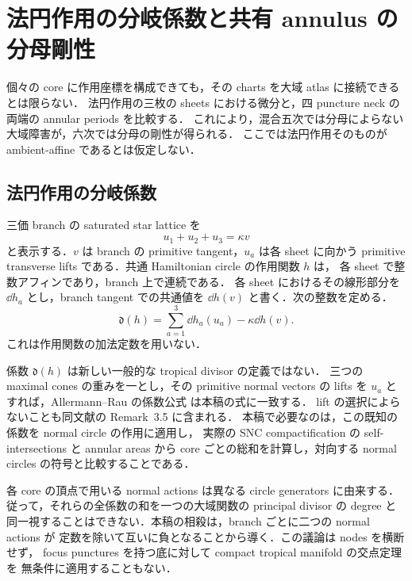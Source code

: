 \section{法円作用の分岐係数と共有 annulus の分母剛性}
\label{mg8:section}

個々の core に作用座標を構成できても，その charts を大域 atlas に接続できるとは限らない．
法円作用の三枚の sheets における微分と，四 puncture neck の両端の annular periods を比較する．
これにより，混合五次では分母によらない大域障害が，六次では分母の剛性が得られる．
ここでは法円作用そのものが ambient-affine であるとは仮定しない．

\subsection{法円作用の分岐係数}

三価 branch の saturated star lattice を
\[
 u_1+u_2+u_3=\kappa v
\]
と表示する．$v$ は branch の primitive tangent，$u_a$ は各 sheet に向かう
primitive transverse lifts である．共通 Hamiltonian circle の作用関数 $h$ は，
各 sheet で整数アフィンであり，branch 上で連続である．
各 sheet におけるその線形部分を $\dd h_a$ とし，branch tangent での共通値を
$\dd h(v)$ と書く．次の整数を定める．
\begin{equation}\label{mg8:defect}
 \mathfrak d(h)=\sum_{a=1}^3\dd h_a(u_a)-\kappa\dd h(v).
\end{equation}
これは作用関数の加法定数を用いない．

\begin{remark}
\label{div9:interpretation}
係数 $\mathfrak d(h)$ は新しい一般的な tropical divisor の定義ではない．
三つの maximal cones の重みを一とし，その primitive normal vectors の lifts を
$u_a$ とすれば，Allermann--Rau の係数公式
\cite[Definition~3.4]{AllermannRau}は本稿の式に一致する．
lift の選択によらないことも同文献の Remark~3.5 に含まれる．
本稿で必要なのは，この既知の係数を normal circle の作用に適用し，
実際の SNC compactification の self-intersections と annular areas から
core ごとの総和を計算し，対向する normal circles の符号と比較することである．

各 core の頂点で用いる normal actions は異なる circle generators に由来する．
従って，それらの全係数の和を一つの大域関数の principal divisor の degree と
同一視することはできない．本稿の相殺は，branch ごとに二つの normal actions が
定数を除いて互いに負となることから導く．この議論は nodes を横断せず，
focus punctures を持つ底に対して compact tropical manifold の交点定理を
無条件に適用することもない．
\end{remark}


